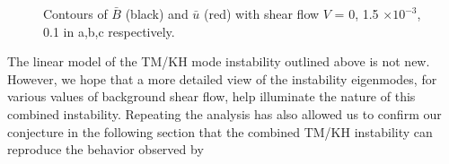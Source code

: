 	
	\begin{figure}[]
		\centering
	   	\caption{Contours of $\bar{B}$ (black) and $\bar{u}$ (red) with shear flow $V$ = 0, 1.5 $\times 10^{-3}$, 0.1 in a,b,c respectively.}
	   \label{fig:contour}
        		
			
	\end{figure}
	
	The linear model of the TM/KH mode instability outlined above is not new. However, we hope that a more detailed view of the instability eigenmodes, for various values of background shear flow, help illuminate the nature of this combined instability.  Repeating the analysis has also allowed us to confirm our conjecture in the following section that the combined TM/KH instability can reproduce the behavior observed by \citet{Brannon2015}


